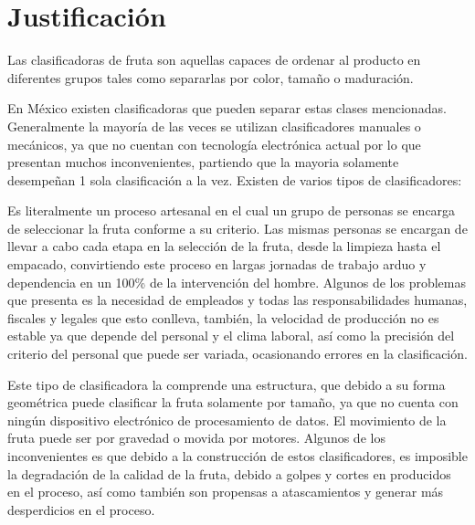\documentclass[twoside,spanish,ESP,MSc]{plantillaLabUPV}
\theoremstyle{definition}
\begin{document}
\section{Justificación}
Las clasificadoras de fruta son aquellas capaces de ordenar al producto en diferentes grupos tales como separarlas por color, tamaño o maduración.

En México existen clasificadoras que pueden separar estas clases mencionadas. Generalmente la mayoría de las veces se utilizan clasificadores manuales o mecánicos, ya que no cuentan con tecnología electrónica actual por lo que presentan muchos inconvenientes, partiendo que la mayoria solamente desempeñan 1 sola clasificación a la vez. Existen de varios tipos de clasificadores:


 Es literalmente un proceso artesanal %
en el cual un grupo de personas  se encarga de seleccionar la fruta conforme a su criterio. Las mismas personas se encargan de llevar a cabo cada etapa en la selección de la fruta, desde la limpieza hasta el empacado, convirtiendo este proceso en largas jornadas de trabajo arduo y dependencia en un 100\% de la intervención del hombre. Algunos de los problemas que presenta es la necesidad de empleados y todas las responsabilidades humanas, fiscales y legales que esto conlleva, también, la velocidad de producción no es estable ya que depende del personal y el clima laboral, así como la precisión del criterio del personal que puede ser variada, ocasionando errores en la clasificación.




 Este tipo de clasificadora %
la comprende una estructura, que debido a su forma geométrica puede clasificar la fruta solamente por tamaño, ya que no cuenta con ningún dispositivo electrónico de procesamiento de datos. El movimiento de la fruta puede ser por gravedad o movida por motores. Algunos de los inconvenientes es que debido a la construcción de estos clasificadores, es imposible la degradación de la calidad de la fruta, debido a golpes y cortes en producidos en el proceso, así como también son propensas a atascamientos y generar más desperdicios en el proceso.
\end{document}
